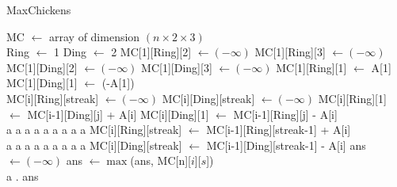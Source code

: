 \documentclass{article}
\begin{document}
\begin{algorithm}[H]
\caption{MaxChickens}
\begin{algorithmic}[1]

    \State MC $\gets$ array of dimension $(n \times 2 \times 3)$
    \\
    \State Ring $\gets$ 1
    \State Ding $\gets$ 2
    \State MC[1][Ring][2] $\gets (-\infty)$ 
    \State MC[1][Ring][3] $\gets (-\infty)$ 
    \State MC[1][Ding][2] $\gets (-\infty)$ 
    \State MC[1][Ding][3] $\gets (-\infty)$ 
    \State MC[1][Ring][1] $\gets$ A[1]
    \State MC[1][Ding][1] $\gets$ (-A[1])
    \\
            \State MC[i][Ring][streak] $\gets (-\infty)$
            \State MC[i][Ding][streak] $\gets (-\infty)$
                            \State MC[i][Ring][1] $\gets$ MC[i-1][Ding][j] + A[i]
                        \EndIf
                    \EndIf
                            \State MC[i][Ding][1] $\gets$ MC[i-1][Ring][j] - A[i]
                        \EndIf
                    \EndIf
                \EndFor
            \Else
                 \\
                    \phantom a \phantom a \phantom a \phantom a \phantom a \phantom a \phantom a \phantom a \phantom a
                    MC[i][Ring][streak] $\gets$ MC[i-1][Ring][streak-1] + A[i]
                \EndIf
                 \\
                    \phantom a \phantom a \phantom a \phantom a \phantom a \phantom a \phantom a \phantom a \phantom a
                    MC[i][Ding][streak] $\gets$ MC[i-1][Ding][streak-1] - A[i]
                \EndIf
            \EndIf
        \EndFor
    \EndFor
    \State ans $\gets (-\infty)$ 
            ans $\gets \max$(ans, MC[n][$i$][$s$])
        \EndFor
    \EndFor
    \\
                    \phantom a \phantom . 
    \Return ans
\EndFunction

\end{algorithmic}
\end{algorithm}
\end{document}
